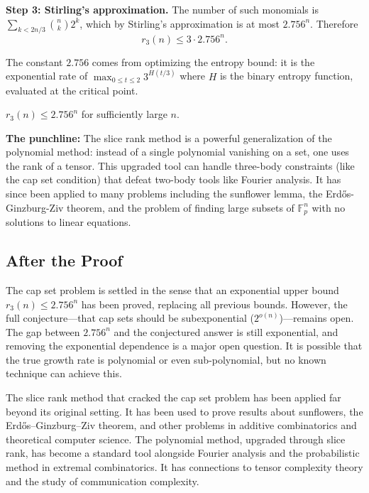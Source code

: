 \textbf{Step 3: Stirling's approximation.} The number of such monomials is $\sum_{k < 2n/3} \binom{n}{k} 2^k$, which by Stirling's approximation is at most $2.756^n$. Therefore
\[
r_3(n) \le 3 \cdot 2.756^n.
\]

The constant $2.756$ comes from optimizing the entropy bound: it is the exponential rate of $\max_{0 \le t \le 2} 3^{H(t/3)}$ where $H$ is the binary entropy function, evaluated at the critical point.

\begin{theorem}
$r_3(n) \le 2.756^n$ for sufficiently large $n$.
\end{theorem}

\begin{highlightbox}
\textbf{The punchline:} The slice rank method is a powerful generalization of the polynomial method: instead of a single polynomial vanishing on a set, one uses the rank of a tensor. This upgraded tool can handle three-body constraints (like the cap set condition) that defeat two-body tools like Fourier analysis. It has since been applied to many problems including the sunflower lemma, the Erd\H{o}s-Ginzburg-Ziv theorem, and the problem of finding large subsets of $\mathbb{F}_p^n$ with no solutions to linear equations.
\end{highlightbox}

\subsection{After the Proof}

The cap set problem is settled in the sense that an exponential upper bound $r_3(n) \le 2.756^n$ has been proved, replacing all previous bounds. However, the full conjecture---that cap sets should be subexponential ($2^{o(n)}$)---remains open. The gap between $2.756^n$ and the conjectured answer is still exponential, and removing the exponential dependence is a major open question. It is possible that the true growth rate is polynomial or even sub-polynomial, but no known technique can achieve this.

The slice rank method that cracked the cap set problem has been applied far beyond its original setting. It has been used to prove results about sunflowers, the Erd\H{o}s--Ginzburg--Ziv theorem, and other problems in additive combinatorics and theoretical computer science. The polynomial method, upgraded through slice rank, has become a standard tool alongside Fourier analysis and the probabilistic method in extremal combinatorics. It has connections to tensor complexity theory and the study of communication complexity.


